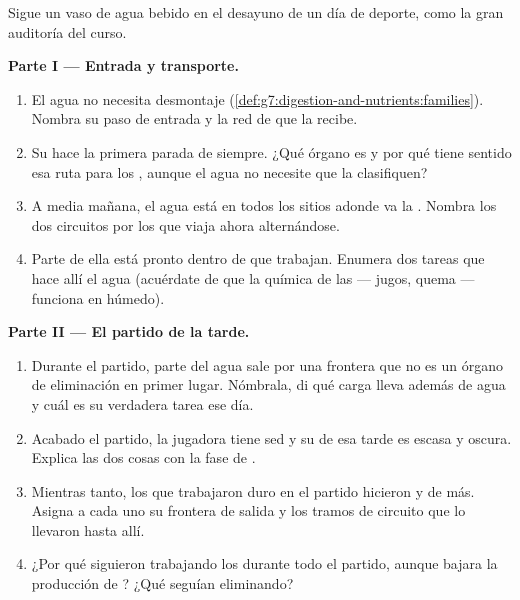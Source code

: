 \begin{problem}\label{pb:g7:removing-wastes:1}
Sigue un vaso de agua bebido en el desayuno de un día de deporte, como
la gran auditoría del curso.

\medskip\noindent\textbf{Parte I --- Entrada y transporte.}
\begin{enumerate}
  \item El agua no necesita desmontaje
        (\cref{def:g7:digestion-and-nutrients:families}). Nombra su
        paso de entrada y la red de  que la recibe.
  \item Su  hace la primera parada de siempre. ¿Qué órgano es y
        por qué tiene sentido esa ruta para los , aunque el
        agua no necesite que la clasifiquen?
  \item A media mañana, el agua está en todos los sitios adonde va la
        . Nombra los dos circuitos por los que viaja ahora
        alternándose.
  \item Parte de ella está pronto dentro de  que trabajan.
        Enumera dos tareas que hace allí el agua (acuérdate de que la
        química de las  --- jugos, quema --- funciona en
        húmedo).
\end{enumerate}

\medskip\noindent\textbf{Parte II --- El partido de la tarde.}
\begin{enumerate}[resume]
  \item Durante el partido, parte del agua sale por una frontera que no
        es un órgano de eliminación en primer lugar. Nómbrala, di qué
        carga lleva además de agua y cuál es su verdadera tarea ese día.
  \item Acabado el partido, la jugadora tiene sed y su  de esa
        tarde es escasa y oscura. Explica las dos cosas con la fase de
        .
  \item Mientras tanto, los  que trabajaron duro en el partido
        hicieron  y  de más. Asigna a cada uno su
        frontera de salida y los tramos de circuito que lo llevaron
        hasta allí.
  \item ¿Por qué siguieron trabajando los  durante todo el
        partido, aunque bajara la producción de ? ¿Qué seguían
        eliminando?
\end{enumerate}


\end{problem}

